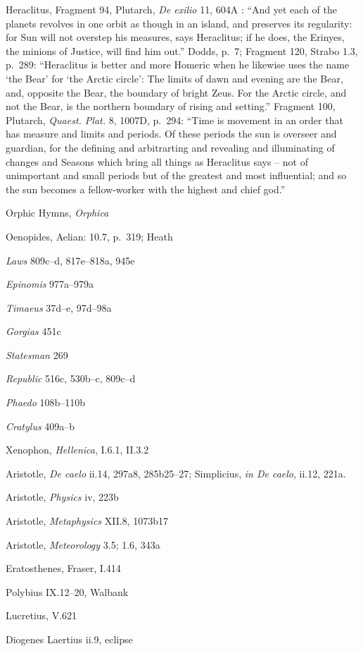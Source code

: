 \documentclass{article}
\begin{document}
Heraclitus, Fragment 94, Plutarch, {\em De exilio} 11, 604A \cite[p.~284]{heraclitus}: ``And yet each of the planets revolves in one orbit as though
in an island, and preserves its regularity: for Sun will not overstep his measures, says Heraclitus; if he does, the Erinyes, the minions of Justice, will
find him out.'' Dodds, p.~7;
Fragment 120, Strabo 1.3, p.~289: ``Heraclitus is better and more Homeric when he likewise uses the name `the Bear' for `the Arctic circle':
The limits of dawn and evening are the Bear, and, opposite the Bear, the boundary of bright Zeus. For the Arctic circle, and not
the Bear, is the northern boundary of rising and setting.''
Fragment 100, Plutarch, {\em Quaest. Plat.} 8, 1007D, p.~294: ``Time is movement in an order that has measure and limits
and periods. Of these periods the sun is overseer and guardian, for the 
defining and arbitrarting and revealing and illuminating of changes and Seasons which bring all things as Heraclitus says -- 
not of unimportant and small periods but of the greatest and most influential; and so the 
sun becomes a fellow-worker with the highest and chief god.''

Orphic Hymns, {\em Orphica}

Oenopides, Aelian: 10.7, p.~319; Heath \cite[p.~130]{aristarchus}

{\em Laws} 809c--d, 817e--818a, 945e

{\em Epinomis} 977a--979a

{\em Timaeus} 37d--e, 97d--98a

{\em Gorgias} 451c

{\em Statesman} 269

{\em Republic} 516c, 530b--c, 809c--d

{\em Phaedo} 108b--110b

{\em Cratylus} 409a--b

Xenophon, {\em Hellenica},  I.6.1, II.3.2

Aristotle, {\em De caelo} ii.14, 297a8, 285b25--27; Simplicius, {\em in De caelo}, ii.12, 221a.

Aristotle, {\em Physics} iv, 223b

Aristotle, {\em Metaphysics} XII.8, 1073b17

Aristotle, {\em Meteorology} 3.5; 1.6, 343a

Eratosthenes, Fraser, I.414

Polybius IX.12--20, Walbank \cite[p.~141]{walbankII}

Lucretius, V.621

Diogenes Laertius ii.9, eclipse
\end{document}
